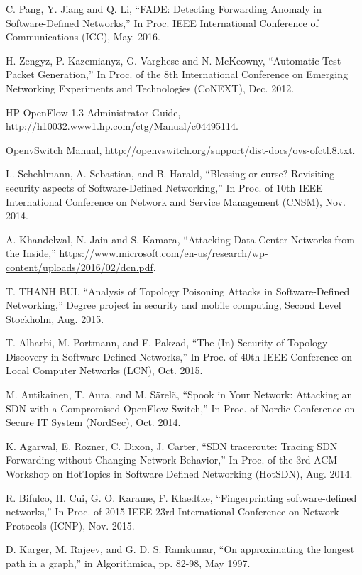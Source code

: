 \documentclass[conference]{IEEEtran}
\begin{document}
\begin{thebibliography}{1}
C. Pang, Y. Jiang and Q. Li,
``FADE: Detecting Forwarding Anomaly in Software-Defined Networks,'' In Proc. IEEE International Conference of Communications (ICC), May. 2016.

H. Zengyz, P. Kazemianyz, G. Varghese and N. McKeowny,
``Automatic Test Packet Generation,'' In Proc. of the 8th International Conference on Emerging Networking Experiments and Technologies (CoNEXT), Dec. 2012.

HP OpenFlow 1.3 Administrator Guide, \url{http://h10032.www1.hp.com/ctg/Manual/c04495114}.

OpenvSwitch Manual, \url{http://openvswitch.org/support/dist-docs/ovs-ofctl.8.txt}.

L. Schehlmann, A. Sebastian, and B. Harald, 
``Blessing or curse? Revisiting security aspects of Software-Defined Networking,'' In Proc. of 10th IEEE International Conference on Network and Service Management (CNSM), Nov. 2014.

A. Khandelwal, N. Jain and S. Kamara,
``Attacking Data Center Networks from the Inside,'' \url{https://www.microsoft.com/en-us/research/wp-content/uploads/2016/02/dcn.pdf}.

T. THANH BUI,
``Analysis of Topology Poisoning Attacks in Software-Defined Networking,'' Degree project in security and mobile computing, Second Level Stockholm, Aug. 2015.

T. Alharbi, M. Portmann, and F. Pakzad,
``The (In) Security of Topology Discovery in Software Defined Networks,'' In Proc. of 40th IEEE Conference on Local Computer Networks (LCN), Oct. 2015.
 
M. Antikainen, T. Aura, and M. Särelä,
``Spook in Your Network: Attacking an SDN with a Compromised OpenFlow Switch,'' In Proc. of Nordic Conference on Secure IT System (NordSec), Oct. 2014.

K. Agarwal, E. Rozner, C. Dixon, J. Carter,
``SDN traceroute: Tracing SDN Forwarding without Changing Network Behavior,'' In Proc. of the 3rd ACM Workshop on HotTopics in Software Defined Networking (HotSDN), Aug. 2014.

R. Bifulco, H. Cui, G. O. Karame, F. Klaedtke,
``Fingerprinting software-defined networks,'' In Proc. of 2015 IEEE 23rd International Conference on Network Protocols (ICNP), Nov. 2015.

D. Karger, M. Rajeev, and G. D. S. Ramkumar,
``On approximating the longest path in a graph,'' in Algorithmica, pp. 82-98, May 1997.


\end{thebibliography}
\end{document}
